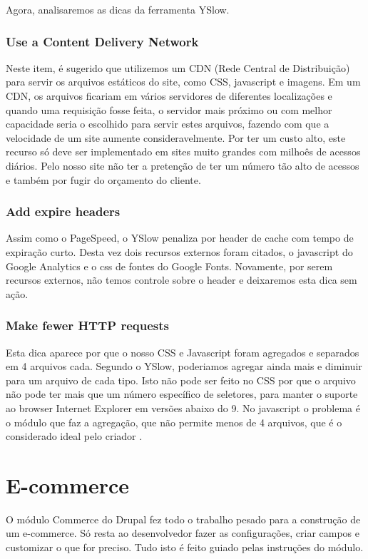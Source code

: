 Agora, analisaremos as dicas da ferramenta YSlow.

\subsubsection{Use a Content Delivery Network}
Neste item, é sugerido que utilizemos um CDN (Rede Central de Distribuição) para servir os arquivos estáticos do site, como CSS, javascript e imagens. Em um CDN, os arquivos ficariam em vários servidores de diferentes localizações e quando uma requisição fosse feita, o servidor mais próximo ou com melhor capacidade seria o escolhido para servir estes arquivos, fazendo com que a velocidade de um site aumente consideravelmente. Por ter um custo alto, este recurso só deve ser implementado em sites muito grandes com milhoês de acessos diários. Pelo nosso site não ter a pretenção de ter um número tão alto de acessos e também por fugir do orçamento do cliente.

\subsubsection{Add expire headers}
Assim como o PageSpeed, o YSlow penaliza por header de cache com tempo de expiração curto. Desta vez dois recursos externos foram citados, o javascript do Google Analytics e o css de fontes do Google Fonts. Novamente, por serem recursos externos, não temos controle sobre o header e deixaremos esta dica sem ação.

\subsubsection{Make fewer HTTP requests}
Esta dica aparece por que o nosso CSS e Javascript foram agregados e separados em 4 arquivos cada. Segundo o YSlow, poderiamos agregar ainda mais e diminuir para um arquivo de cada tipo. Isto não pode ser feito no CSS por que o arquivo não pode ter mais que um número específico de seletores, para manter o suporte ao browser Internet Explorer em versões abaixo do 9. No javascript o problema é o módulo que faz a agregação, que não permite menos de 4 arquivos, que é o considerado ideal pelo criador \cite{AdvAgg}.

\section{E-commerce}
O módulo Commerce do Drupal fez todo o trabalho pesado para a construção de um e-commerce. Só resta ao desenvolvedor fazer as configurações, criar campos e customizar o que for preciso. Tudo isto é feito guiado pelas instruções do módulo.


